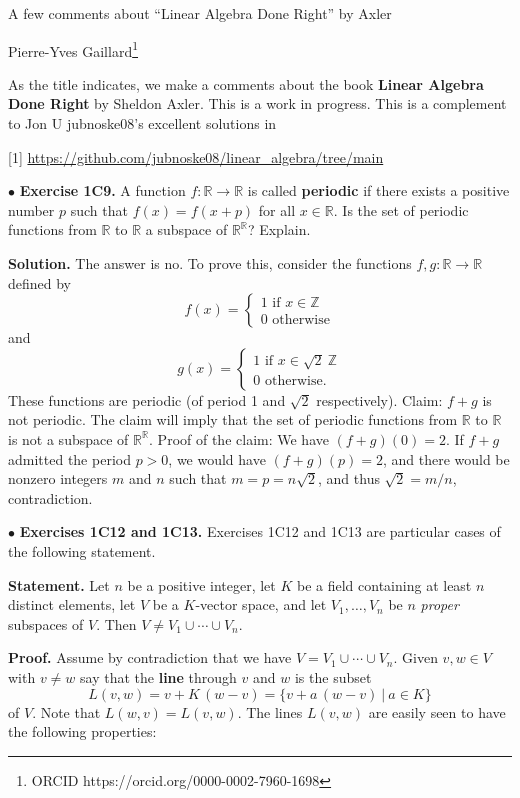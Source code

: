 \documentclass[11pt,letterpaper]{article}
\newcommand{\noi}{\noindent}%
\newcommand{\R}{\mathbb R}
\newcommand{\Z}{\mathbb Z}
\begin{document}
\begin{center}
{\LARGE A few comments about ``Linear Algebra Done Right'' by Axler}\bigskip 

Pierre-Yves Gaillard\footnote{ORCID https://orcid.org/0000-0002-7960-1698} 
\end{center}%

\noi As the title indicates, we make a comments about the book \textbf{Linear Algebra Done Right} by Sheldon Axler. This is a work in progress. This is a complement to Jon U jubnoske08's excellent solutions in 

[1] \url{https://github.com/jubnoske08/linear_algebra/tree/main}%

\noi$\bullet$ \textbf{Exercise 1C9.} A function $f:\R\to\R$ is called \textbf{periodic} if there exists a positive number $p$ such that $f(x) = f(x+p)$ for all $x\in\R$.  Is the set of periodic functions from $\R$ to $\R$ a subspace of $\R^\R$?  Explain. 

\noi\textbf{Solution.} The answer is no. To prove this, consider the functions $f,g:\R\to\R$ defined by 
$$
f(x)=
\begin{cases}
1\text{ if }x\in\Z\\ 
0\text{ otherwise}
\end{cases}
$$ 
and 
$$
g(x)=
\begin{cases}
1\text{ if }x\in\sqrt2\ \Z\\ 
0\text{ otherwise}.
\end{cases}
$$ 
These functions are periodic (of period 1 and $\sqrt2$ respectively). Claim: $f+g$ is not periodic. The claim will imply that the set of periodic functions from $\R$ to $\R$ is not a subspace of $\R^\R$. Proof of the claim: We have $(f+g)(0)=2$. If $f+g$ admitted the period $p>0$, we would have $(f+g)(p)=2$, and there would be nonzero integers $m$ and $n$ such that $m=p=n\sqrt2$, and thus $\sqrt2=m/n$, contradiction. 


\noi$\bullet$ \textbf{Exercises 1C12 and 1C13.} Exercises 1C12 and 1C13 are particular cases of the following statement. 

\noi\textbf{Statement.} Let $n$ be a positive integer, let $K$ be a field containing at least $n$ distinct elements, let $V$ be a $K$-vector space, and let $V_1,\ldots,V_n$ be $n$ \emph{proper} subspaces of $V$. Then $V\ne V_1\cup\cdots\cup V_n$. 

\noi\textbf{Proof.} Assume by contradiction that we have $V=V_1\cup\cdots\cup V_n$. Given $v,w\in V$ with $v\ne w$ say that the \textbf{line} through $v$ and $w$ is the subset 
$$
L(v,w)=v+K\,(w-v)=\{v+a\,(w-v)\ |\ a\in K\}
$$ 
of $V$. Note that $L(w,v)=L(v,w)$. The lines $L(v,w)$ are easily seen to have the following properties: 
\end{document}

